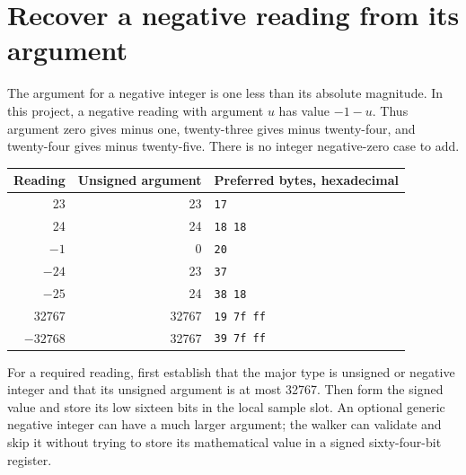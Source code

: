 \section{Recover a negative reading from its argument}
The argument for a negative integer is one less than its absolute magnitude. In this
project, a negative reading with argument $u$ has value $-1-u$. Thus argument zero gives
minus one, twenty-three gives minus twenty-four, and twenty-four gives minus twenty-five.
There is no integer negative-zero case to add.

\begin{center}
  \begin{tabular}{rrl}
    Reading  & Unsigned argument & Preferred bytes, hexadecimal \\
    \hline
    23       & 23                & \texttt{17}                  \\
    24       & 24                & \texttt{18 18}               \\
    $-1$     & 0                 & \texttt{20}                  \\
    $-24$    & 23                & \texttt{37}                  \\
    $-25$    & 24                & \texttt{38 18}               \\
    32767    & 32767             & \texttt{19 7f ff}            \\
    $-32768$ & 32767             & \texttt{39 7f ff}            \\
  \end{tabular}
\end{center}

For a required reading, first establish that the major type is unsigned or negative
integer and that its unsigned argument is at most 32767. Then form the signed value
and store its low sixteen bits in the local sample slot. An optional generic negative
integer can have a much larger argument; the walker can validate and skip it without
trying to store its mathematical value in a signed sixty-four-bit register.
